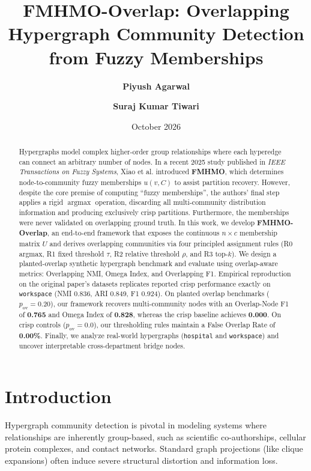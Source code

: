 \documentclass[11pt,a4paper]{article}
\title{\textbf{FMHMO-Overlap: Overlapping Hypergraph Community Detection from Fuzzy Memberships}}
\author{\textbf{Piyush Agarwal} \and \textbf{Suraj Kumar Tiwari}}
\date{October 2026}
\begin{document}
\maketitle

\begin{abstract}
Hypergraphs model complex higher-order group relationships where each hyperedge can connect an arbitrary number of nodes. In a recent 2025 study published in \textit{IEEE Transactions on Fuzzy Systems}, Xiao et al. introduced \textbf{FMHMO}, which determines node-to-community fuzzy memberships $u(v, C)$ to assist partition recovery. However, despite the core premise of computing ``fuzzy memberships'', the authors' final step applies a rigid $\operatorname{argmax}$ operation, discarding all multi-community distribution information and producing exclusively crisp partitions. Furthermore, the memberships were never validated on overlapping ground truth. In this work, we develop \textbf{FMHMO-Overlap}, an end-to-end framework that exposes the continuous $n \times c$ membership matrix $U$ and derives overlapping communities via four principled assignment rules (R0 argmax, R1 fixed threshold $\tau$, R2 relative threshold $\rho$, and R3 top-$k$). We design a planted-overlap synthetic hypergraph benchmark and evaluate using overlap-aware metrics: Overlapping NMI, Omega Index, and Overlapping F1. Empirical reproduction on the original paper's datasets replicates reported crisp performance exactly on \texttt{workspace} (NMI 0.836, ARI 0.849, F1 0.924). On planted overlap benchmarks ($p_{\text{ov}} = 0.20$), our framework recovers multi-community nodes with an Overlap-Node F1 of \textbf{0.765} and Omega Index of \textbf{0.828}, whereas the crisp baseline achieves \textbf{0.000}. On crisp controls ($p_{\text{ov}} = 0.0$), our thresholding rules maintain a False Overlap Rate of \textbf{0.00\%}. Finally, we analyze real-world hypergraphs (\texttt{hospital} and \texttt{workspace}) and uncover interpretable cross-department bridge nodes.
\end{abstract}

\section{Introduction}
Hypergraph community detection is pivotal in modeling systems where relationships are inherently group-based, such as scientific co-authorships, cellular protein complexes, and contact networks. Standard graph projections (like clique expansions) often induce severe structural distortion and information loss.
\end{document}
